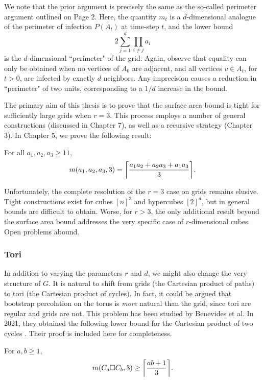 We note that the prior argument is precisely the same as the so-called perimeter argument outlined on Page 2. Here, the quantity $m_t$ is a $d$-dimensional analogue of the perimeter of infection $P(A_t)$ at time-step $t$, and the lower bound
$$2\sum_{j=1}^d \prod_{i \neq j} a_i$$
is the $d$-dimensional ``perimeter" of the grid. Again, observe that equality can only be obtained when no vertices of $A_0$ are adjacent, and all vertices $v \in A_{t}$, for $t>0$, are infected by exactly $d$ neighbors. Any imprecision causes a reduction in ``perimeter" of two units, corresponding to a $1/d$ increase in the bound. 

The primary aim of this thesis is to prove that the surface area bound is tight for sufficiently large grids when $r=3$. This process employs a number of general constructions (discussed in Chapter 7), as well as a recursive strategy (Chapter 3). In Chapter 5, we prove the following result:

\begin{thm}
\label{thm:main_result}
For all $a_1, a_2, a_3 \geq 11$, 
$$m(a_1,a_2,a_3,3) = \ceil*{\frac{a_1a_2+a_2a_3+a_1a_3}{3}}.$$
\end{thm}

Unfortunately, the complete resolution of the $r=3$ case on grids remains elusive. Tight constructions exist for cubes $[n]^3$ and hypercubes $[2]^d$, but in general bounds are difficult to obtain. Worse, for $r>3$, the only additional result beyond the surface area bound addresses the very specific case of $r$-dimensional cubes. Open problems abound.

\subsubsection{Tori}

In addition to varying the parameters $r$ and $d$, we might also change the very structure of $G$. It is natural to shift from grids (the Cartesian product of paths) to tori (the Cartesian product of cycles). In fact, it could be argued that bootstrap percolation on the torus is \emph{more} natural than the grid, since tori are regular and grids are not. This problem has been studied by Benevides et al. In 2021, they obtained the following lower bound for the Cartesian product of two cycles \cite{benevides:2021}. Their proof is included here for completeness.

\begin{thm}
\label{thm:torus_lb}
For $a, b \geq 1$,
$$m(C_a \square C_b,3) \geq \ceil*{\frac{ab +1}{3}}.$$
\end{thm}

